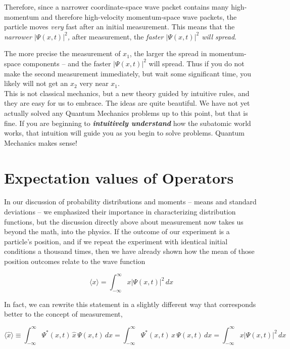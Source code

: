 Therefore, since a narrower coordinate-space wave packet contains many
high-momentum and therefore high-velocity momentum-space wave packets, the
particle moves \textit{very} fast after an initial measurement. This means that
the \textit{narrower $|\Psi(x, t)|^2$,} after measurement, the \textit{faster
$|\Psi(x, t)|^2$ will spread}. 

The more precise the measurement of $x_1$, the larger the spread
in momentum-space components -- and the faster $|\Psi(x, t)|^2$ will spread.
Thus if you do not make the second measurement immediately,
but wait some significant time, you likely will not get an $x_2$ very near
$x_1$. \\

This is not classical mechanics, but a new theory guided by intuitive rules,
and they are easy for us to embrace. The ideas are quite beautiful. We have not
yet actually solved any Quantum Mechanics problems up to this point, but that
is fine. If you are beginning to \textbf{\textit{intuitively understand}} how
the subatomic world works, that intuition will guide you as you begin to solve
problems. Quantum Mechanics makes sense! 

\section{Expectation values of Operators}

In our discussion of probability distributions and moments -- means and
standard deviations -- we emphasized their importance in characterizing
distribution functions, but the  discussion directly above about measurement
now takes us beyond the math, into the physics. If the outcome of our
experiment is a particle's position, and if we repeat the experiment with
identical initial conditions a thousand times, then we have already shown how
the mean of those position outcomes relate to the wave function

\[
\langle x \rangle = \int_{-\infty}^{\infty} x |\Psi(x, t)|^2 \, dx
\] \vspace{3px}

In fact, we can rewrite this statement in a slightly different way that
corresponds better to the concept of measurement, 

\[
\langle \hat{x} \rangle \equiv \int_{-\infty}^{\infty} \Psi^*(x, t) \,\hat{x}\,
\Psi(x, t) \, dx = \int_{-\infty}^{\infty} \Psi^*(x, t) \, x \, \Psi(x, t)\, dx
= \int_{-\infty}^{\infty} x |\Psi(x, t)|^2 \, dx
\] \vspace{3px}

